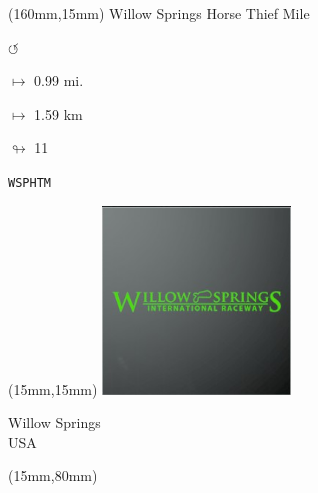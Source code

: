 \begin{textblock*}{40mm}(160mm,15mm)%
Willow Springs Horse Thief Mile
\par \Huge$\circlearrowleft$
\Large
\par$\mapsto$ 0.99 mi.
\par$\mapsto$ 1.59 km
\par$\looparrowright$ 11
\par\hfill\tiny\tt WSPHTM\\
\end{textblock*}
\null\newpage

\begin{textblock*}{50mm}(15mm,15mm)%
\includegraphics[width=50mm]{LG/2015-05-20_00098.png}
\par Willow Springs\\ USA
\end{textblock*}
\begin{textblock*}{185mm}(15mm,80mm)%
\end{textblock*}
